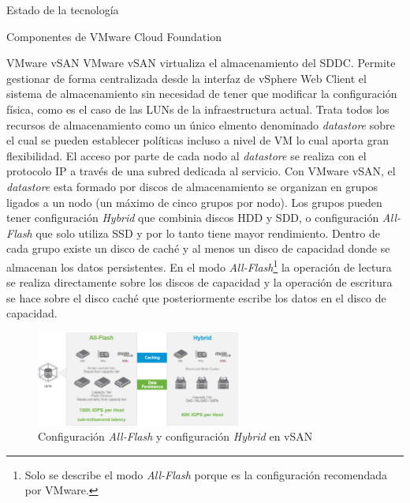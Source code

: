 \begin{section}{Estado de la tecnología}
\begin{subsection}{Componentes de VMware Cloud Foundation}
\begin{subsubsection}{VMware vSAN}
    VMware vSAN virtualiza el almacenamiento del SDDC. Permite gestionar de forma centralizada desde la interfaz de vSphere Web Client el sistema de almacenamiento sin necesidad de tener que modificar la configuración física, como es el caso de las LUNs de la infraestructura actual. Trata todos los recursos de almacenamiento como un único elmento denominado \textit{datastore} sobre el cual se pueden establecer políticas incluso a nivel de VM lo cual aporta gran flexibilidad. El acceso por parte de cada nodo al \textit{datastore} se realiza con el protocolo IP a través de una subred dedicada al servicio. Con VMware vSAN, el \textit{datastore} esta formado por discos de almacenamiento se organizan en grupos ligados a un nodo (un máximo de cinco grupos por nodo). Los grupos pueden tener configuración \textit{Hybrid} que combinia discos HDD y SDD, o configuración \textit{All-Flash} que solo utiliza SSD y por lo tanto tiene mayor rendimiento. Dentro de cada grupo existe un disco de caché y al menos un disco de capacidad donde se almacenan los datos persistentes\cite{operacionesVSAN}. En el modo \textit{All-Flash}\footnote{Solo se describe el modo \textit{All-Flash} porque es la configuración recomendada por VMware.} la operación de lectura se realiza directamente sobre los discos de capacidad y la operación de escritura se hace sobre el disco caché que posteriormente escribe los datos en el disco de capacidad.
    
    \begin{figure}[h]
    \centering
        \includegraphics[width=0.6\textwidth]{imaxes/cap2recursos/rendimientoVSAN.png}
        \caption{Configuración \textit{All-Flash} y configuración \textit{Hybrid} en vSAN}
        \label{fig:performance-Hybrid-AllFlash-vSAN}
    \end{figure}
    \FloatBarrier
\end{subsubsection}


\end{subsection}
\end{section}
